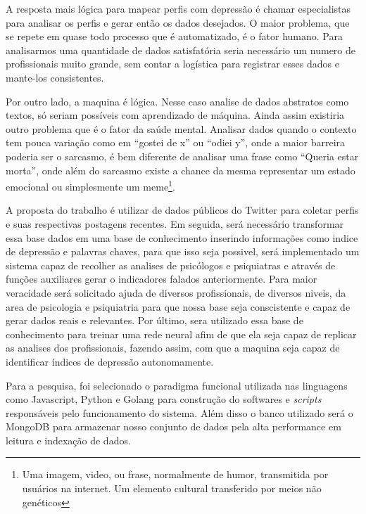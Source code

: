 A resposta mais lógica para mapear perfis com depressão é chamar especialistas para analisar os perfis e gerar então os dados desejados. O maior problema, que se repete em quase todo processo que é automatizado, é o fator humano. Para analisarmos uma quantidade de dados satisfatória seria necessário um numero de profissionais muito grande, sem contar a logística para registrar esses dados e mante-los consistentes.

Por outro lado, a maquina é lógica. Nesse caso analise de dados abstratos como textos, só seriam possíveis com aprendizado de máquina. Ainda assim existiria outro problema que é o fator da saúde mental. Analisar dados quando o contexto tem pouca variação como em “gostei de x” ou “odiei y”, onde a maior barreira poderia ser o sarcasmo, é bem diferente de analisar uma frase como “Queria estar morta”, onde além do sarcasmo existe a chance da mesma representar um estado emocional ou simplesmente um meme\footnote{Uma imagem, video, ou frase, normalmente de humor, transmitida por usuários na internet. Um elemento cultural transferido por meios não genéticos}.

A proposta do trabalho é utilizar de dados públicos do Twitter para coletar perfis e suas respectivas postagens recentes. Em seguida, será necessário transformar essa base dados em uma base de conhecimento inserindo informações como indice de depressão e palavras chaves, para que isso seja possivel, será implementado um sistema capaz de recolher as analises de psicólogos e psiquiatras e através de funções auxiliares gerar o indicadores falados anteriormente. Para maior veracidade será solicitado ajuda de diversos profissionais, de diversos niveis, da area de psicologia e psiquiatria para que nossa base seja conscistente e capaz de gerar dados reais e relevantes. Por último, sera utilizado essa base de conhecimento para treinar uma rede neural afim de que ela seja capaz de replicar as analises dos profissionais, fazendo assim, com que a maquina seja capaz de identificar índices de depressão autonomamente.

Para a pesquisa, foi selecionado o paradigma funcional utilizada nas linguagens como Javascript, Python e Golang para construção do softwares e \textit{scripts} responsáveis pelo funcionamento do sistema. Além disso o banco utilizado será o MongoDB para armazenar nosso conjunto de dados pela alta performance em leitura e indexação de dados.
